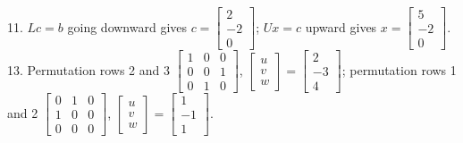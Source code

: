 11. \(Lc=b\) going downward gives \(c=\begin{bmatrix}2\\ -2\\ 0\end{bmatrix}\); \(Ux=c\) upward gives \(x=\begin{bmatrix}5\\ -2\\ 0\end{bmatrix}\).
13. Permutation rows 2 and 3 \(\begin{bmatrix}1&0&0\\ 0&0&1\\ 0&1&0\end{bmatrix}\), \(\begin{bmatrix}u\\ v\\ w\end{bmatrix}=\begin{bmatrix}2\\ -3\\ 4\end{bmatrix}\); permutation rows 1 and 2 \(\begin{bmatrix}0&1&0\\ 1&0&0\\ 0&0&0\end{bmatrix}\), \(\begin{bmatrix}u\\ v\\ w\end{bmatrix}=\begin{bmatrix}1\\ -1\\ 1\end{bmatrix}\).
